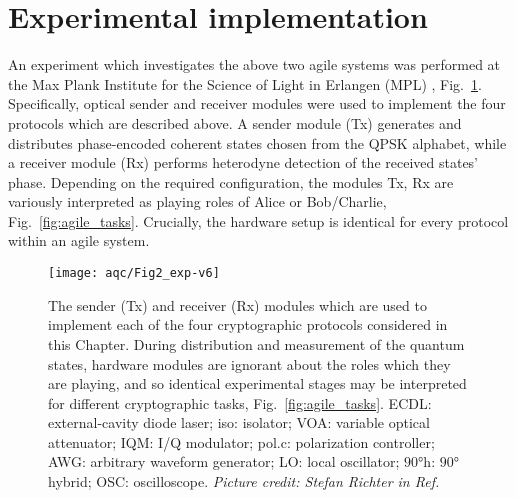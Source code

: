 \section{Experimental implementation}\label{sec:aqc_experiment}

An experiment which investigates the above two agile systems was performed at the Max Plank Institute for the Science of Light in Erlangen (MPL) \cite{Richter2020}, Fig.~\ref{fig:aqc_experiment}. Specifically, optical sender  and receiver modules were used to implement the four protocols which are described above. A sender module (Tx) generates and distributes phase-encoded coherent states chosen from the QPSK alphabet, while a receiver module (Rx) performs heterodyne detection of the received states' phase. Depending on the required configuration, the modules Tx, Rx are variously interpreted as playing roles of Alice or Bob/Charlie, Fig.~\ref{fig:agile_tasks}. Crucially, the hardware setup is identical for every protocol within an agile system.

\begin{figure}[htp]
\captionsetup{width=\linewidth}
\centering
\texttt{[image: aqc/Fig2\_exp-v6]}
\caption{\label{fig:aqc_experiment} The sender (Tx) and receiver (Rx) modules which are used to implement each of the four cryptographic protocols considered in this Chapter. During distribution and measurement of the quantum states, hardware modules are ignorant about the roles which they are playing, and so identical experimental stages may be interpreted for different cryptographic tasks, Fig.~\ref{fig:agile_tasks}. ECDL: external-cavity diode laser; iso: isolator; VOA: variable optical attenuator; IQM: I/Q modulator; pol.c: polarization controller; AWG: arbitrary waveform generator; LO: local oscillator; $90\si{\degree}$h: $90\si{\degree}$ hybrid; OSC: oscilloscope. \emph{Picture credit: Stefan Richter in Ref.~\cite{Richter2020}}}
\end{figure}

